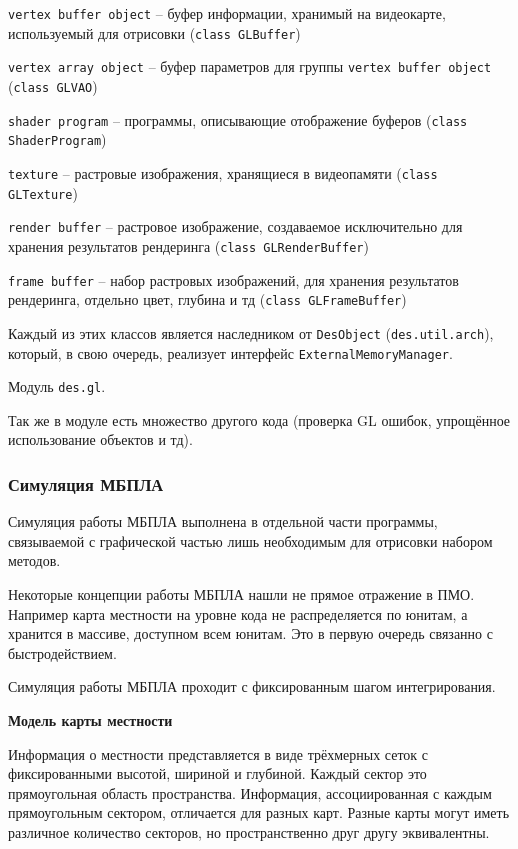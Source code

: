\begin{mintemize}
\item \verb|vertex buffer object| -- буфер информации,
    хранимый на видеокарте, используемый для отрисовки
    (\verb|class GLBuffer|)
\item \verb|vertex array object| -- буфер параметров для
    группы \verb|vertex buffer object| (\verb|class GLVAO|)
\item \verb|shader program| -- программы, описывающие
    отображение буферов \linebreak (\verb|class ShaderProgram|)
\item \verb|texture| -- растровые изображения, хранящиеся
    в видеопамяти (\verb|class GLTexture|)
\item \verb|render buffer| -- растровое изображение, создаваемое
    исключительно для хранения результатов рендеринга
    (\verb|class GLRenderBuffer|)
\item \verb|frame buffer| -- набор растровых изображений,
    для хранения результатов рендеринга, отдельно цвет,
    глубина и тд (\verb|class GLFrameBuffer|)
\end{mintemize}

Каждый из этих классов является наследником от \verb|DesObject|
(\verb|des.util.arch|), который, в свою очередь, реализует интерфейс
\verb|ExternalMemoryManager|.

Модуль \verb|des.gl|.

Так же в модуле есть множество другого кода (проверка GL ошибок,
упрощённое использование объектов и тд).

\newpage
\subsubsection{Симуляция МБПЛА}

Симуляция работы МБПЛА выполнена в отдельной части программы,
связываемой с графической частью лишь необходимым для отрисовки
набором методов.

Некоторые концепции работы МБПЛА нашли не прямое отражение в ПМО.
Например карта местности на уровне кода не распределяется по юнитам,
а хранится в массиве, доступном всем юнитам. Это в первую очередь
связанно с быстродействием.

Симуляция работы МБПЛА проходит с фиксированным шагом интегрирования.

\newpage
\textbf{Модель карты местности}

Информация о местности представляется в виде трёхмерных сеток с фиксированными
высотой, шириной и глубиной. Каждый сектор это прямоугольная область пространства.
Информация, ассоциированная с каждым прямоугольным сектором, отличается для разных
карт. Разные карты могут иметь различное количество секторов, но пространственно
друг другу эквивалентны.

